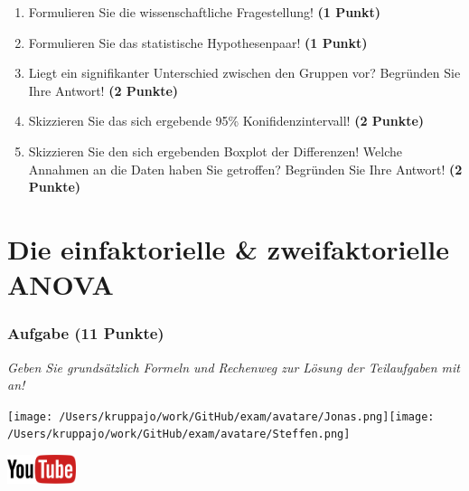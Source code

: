 \documentclass[a4paper, 9pt]{scrartcl}\usepackage[]{graphicx}\usepackage[]{xcolor}
\begin{document}
\begin{enumerate}
  \item Formulieren Sie die wissenschaftliche Fragestellung! \textbf{(1 Punkt)}
  \item Formulieren Sie das statistische Hypothesenpaar! \textbf{(1 Punkt)}
\item Liegt ein signifikanter Unterschied zwischen den Gruppen vor?
  Begründen Sie Ihre Antwort! \textbf{(2 Punkte)}
\item Skizzieren Sie das sich ergebende 95\% Konifidenzintervall! \textbf{(2 Punkte)}
\item Skizzieren Sie den sich ergebenden Boxplot der Differenzen! Welche Annahmen an die Daten haben Sie getroffen? Begründen Sie Ihre Antwort! \textbf{(2 Punkte)} 
\end{enumerate}
 
\clearpage
\part{Die einfaktorielle \& zweifaktorielle ANOVA}

\section{Aufgabe \hfill (11 Punkte)}

\textit{Geben Sie grundsätzlich Formeln und Rechenweg zur Lösung der Teilaufgaben mit an!} \\[1Ex]
 

 
\begin{minipage}[t]{0.5\textwidth}
\texttt{[image: /Users/kruppajo/work/GitHub/exam/avatare/Jonas.png]}\hspace{-4mm}\texttt{[image: /Users/kruppajo/work/GitHub/exam/avatare/Steffen.png]}
\end{minipage}
\begin{minipage}[t]{0.5\textwidth}
\hfill
\href{https://youtu.be/kHmfEmU6lrk}{\includegraphics[width = 2cm]{img/youtube}}
\end{minipage}
\vspace{1ex}
\end{document}
